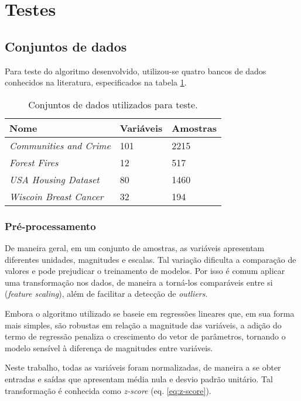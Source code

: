 \section{Testes}

\subsection{Conjuntos de dados}

Para teste do algoritmo desenvolvido, utilizou-se quatro bancos de dados conhecidos na literatura, 
especificados na tabela \ref{tbl:datasets}.
\begin{table}[H]
    \caption{Conjuntos de dados utilizados para teste.}
    \centering
    \begin{tabular}{@{}lll@{}}
    \toprule
    Nome                           & Variáveis & Amostras \\ \midrule
    \textit{Communities and Crime} \cite{ds_crime} & 101       & 2215     \\
    \textit{Forest Fires} \cite{ds_forest}         & 12        & 517      \\
    \textit{USA Housing Dataset} \cite{ds_house}   & 80        & 1460     \\
    \textit{Wiscoin Breast Cancer} \cite{ds_cancer}& 32        & 194      \\ \bottomrule
    \end{tabular}
    \label{tbl:datasets}
\end{table}

\subsubsection{Pré-processamento}

De maneira geral, em um conjunto de amostras, as variáveis apresentam diferentes unidades, magnitudes e escalas. Tal variação dificulta a comparação de valores e pode prejudicar o treinamento de modelos. Por isso é comum aplicar uma transformação nos dados, de maneira a torná-los comparáveis entre si (\textit{feature scaling}), além de facilitar a detecção de \textit{outliers}.

Embora o algoritmo utilizado se baseie em regressões lineares que, em sua forma mais simples, são robustas em  relação a magnitude das variáveis, a adição do termo de regressão penaliza o crescimento do vetor de parâmetros, tornando o modelo sensível à diferença de magnitudes entre variáveis.

Neste trabalho, todas as variáveis foram normalizadas, de maneira a se obter entradas e saídas que apresentam média nula e desvio padrão unitário. Tal transformação é conhecida como \textit{z-score} (eq. \ref{eq:z-score}).

